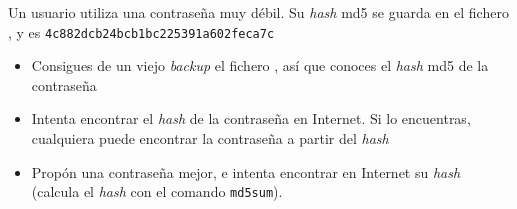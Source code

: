 \begin{homeworkProblem}

  \begin{multicols}{2}

    \null \vfill
    \begin{ActividadAdmin}
      Un usuario utiliza una contraseña muy débil. Su \textit{hash} md5 se guarda en el fichero , y es \texttt{4c882dcb24bcb1bc225391a602feca7c}
    \end{ActividadAdmin}
    \vfill \null
    \columnbreak


    \begin{ActividadHacker}
      \begin{itemize}
      \item Consigues de un viejo \textit{backup} el fichero , así que conoces el \textit{hash} md5 de la contraseña
      \item Intenta encontrar el \textit{hash} de la contraseña en Internet. Si lo encuentras, cualquiera puede encontrar la contraseña a partir del \textit{hash}
        \item Propón una contraseña mejor, e intenta encontrar en Internet su \textit{hash} (calcula el \textit{hash} con el comando \texttt{md5sum}).  
      \end{itemize}
    \end{ActividadHacker}
  \end{multicols}

\end{homeworkProblem}

